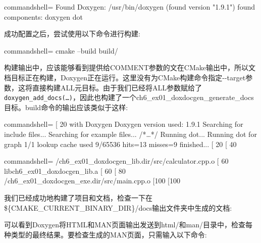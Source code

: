 \begin{tcblisting}{commandshell={}}
Found Doxygen: /usr/bin/doxygen (found version "1.9.1")
    found components: doxygen dot
\end{tcblisting}

成功配置之后，尝试使用以下命令进行构建:

\begin{tcblisting}{commandshell={}}
cmake --build build/
\end{tcblisting}

构建输出中，应该能够看到提供给COMMENT参数的文在CMake输出中，所以文档目标正在构建，Doxygen正在运行。这里没有为CMake构建命令指定-{}-target参数，这将直接构建ALL元目标。由于我们已经将ALL参数赋给了\texttt{doxygen\_add\_docs(…)}，因此也构建了一个ch6\_ex01\_doxdocgen\_generate\_docs目标。build命令的输出应该类似于这样:

\begin{tcblisting}{commandshell={}}
[ 20%
with Doxygen
Doxygen version used: 1.9.1
Searching for include files...
Searching for example files...
/*…*/
Running dot...
Running dot for graph 1/1
lookup cache used 9/65536 hits=13 misses=9
finished...
[ 20%
[ 40%
\end{tcblisting}
\begin{tcblisting}{commandshell={}}
  /ch6_ex01_doxdocgen_lib.dir/src/calculator.cpp.o
[ 60%
libch6_ex01_doxdocgen_lib.a
[ 60%
[ 80%
  /ch6_ex01_doxdocgen_exe.dir/src/main.cpp.o
[100%
[100%
\end{tcblisting}

我们已经成功地构建了项目和文档，检查一下在\$\{CMAKE\_CURRENT\_BINARY\_DIR\}/docs输出文件夹中生成的文档:


可以看到Doxygen将HTML和MAN页面输出发送到html/和man/目录中，检查每种类型的最终结果。要检查生成的MAN页面，只需输入以下命令:

